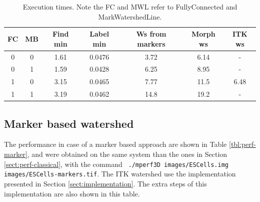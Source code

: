 \documentclass{InsightArticle}
\begin{document}
\begin{table}[htbp]
\centering
\begin{tabular}{cc|ccc|cc}
\hline
FC & MB & Find min &  Label min & Ws from markers & Morph ws &  ITK ws \\
\hline
\hline
0 &      0 &      1.61 &   0.0476 & 3.72 &   6.14 &   - \\
0 &      1 &      1.59 &   0.0428 & 6.25 &   8.95 &   - \\
1 &      0 &      3.15 &   0.0465 & 7.77 &   11.5 &   6.48 \\
1 &      1 &      3.19  &  0.0462  &14.8 &   19.2  &  - \\
\hline
\end{tabular}
\caption{Execution times. Note the FC and MWL refer to FullyConnected and MarkWatershedLine.\label{tbl:perf}}
\end{table}

\subsection{Marker based watershed}
\label{sect:perf-marker}
The performance in case of a marker based approach are shown in Table
\ref{tbl:perf-marker}, and were obtained on the same system than the
ones in Section \ref{sect:perf-classical}, with the command {\tt 
./mperf3D images/ESCells.img images/ESCells-markers.tif}.
The ITK watershed use the implementation presented in Section
\ref{sect:implementation}. The extra steps of this implementation are
also shown in this table.
\end{document}
